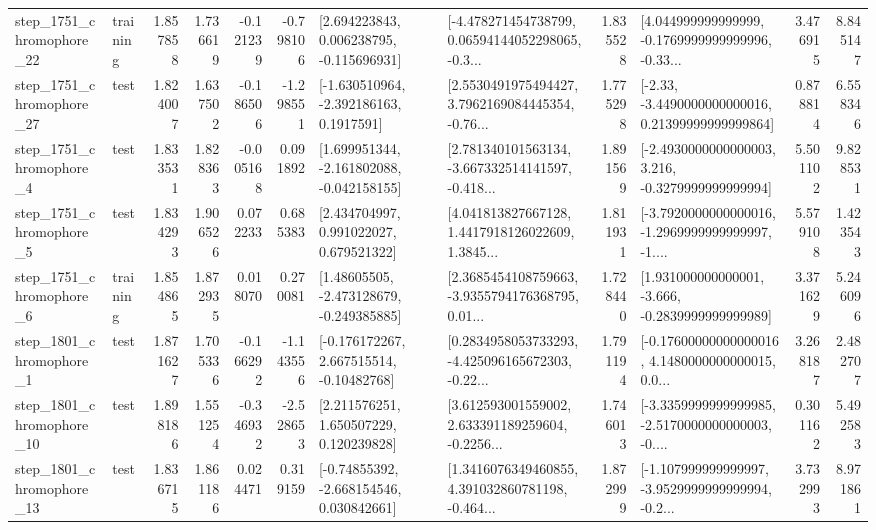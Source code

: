 \begin{tabular}{llrrrrllrlrr}
 step\_1751\_chromophore\_22 &  training &      1.857858 &    1.736619 &     -0.121239 & -0.798106 &    [2.694223843, 0.006238795, -0.115696931] &  [-4.478271454738799, 0.06594144052298065, -0.3... &       1.835528 &  [4.044999999999999, -0.1769999999999996, -0.33... &            3.476915 &          8.845147 \\
 step\_1751\_chromophore\_27 &      test &      1.824007 &    1.637502 &     -0.186506 & -1.298551 &     [-1.630510964, -2.392186163, 0.1917591] &  [2.5530491975494427, 3.7962169084445354, -0.76... &       1.775298 &  [-2.33, -3.4490000000000016, 0.21399999999999864] &            0.878814 &          6.558346 \\
  step\_1751\_chromophore\_4 &      test &      1.833531 &    1.828363 &     -0.005168 &  0.091892 &   [1.699951344, -2.161802088, -0.042158155] &  [2.781340101563134, -3.667332514141597, -0.418... &       1.891569 &  [-2.4930000000000003, 3.216, -0.3279999999999994] &            5.501102 &          9.828531 \\
  step\_1751\_chromophore\_5 &      test &      1.834293 &    1.906526 &      0.072233 &  0.685383 &     [2.434704997, 0.991022027, 0.679521322] &  [4.041813827667128, 1.4417918126022609, 1.3845... &       1.811931 &  [-3.7920000000000016, -1.2969999999999997, -1.... &            5.579108 &          1.423543 \\
  step\_1751\_chromophore\_6 &  training &      1.854865 &    1.872935 &      0.018070 &  0.270081 &    [1.48605505, -2.473128679, -0.249385885] &  [2.3685454108759663, -3.9355794176368795, 0.01... &       1.728440 &   [1.931000000000001, -3.666, -0.2839999999999989] &            3.371629 &          5.246096 \\
  step\_1801\_chromophore\_1 &      test &      1.871627 &    1.705336 &     -0.166292 & -1.143556 &    [-0.176172267, 2.667515514, -0.10482768] &  [0.2834958053733293, -4.425096165672303, -0.22... &       1.791194 &  [-0.17600000000000016, 4.1480000000000015, 0.0... &            3.268187 &          2.482707 \\
 step\_1801\_chromophore\_10 &      test &      1.898186 &    1.551254 &     -0.346932 & -2.528653 &     [2.211576251, 1.650507229, 0.120239828] &  [3.612593001559002, 2.633391189259604, -0.2256... &       1.746013 &  [-3.3359999999999985, -2.5170000000000003, -0.... &            0.301162 &          5.492583 \\
 step\_1801\_chromophore\_13 &      test &      1.836715 &    1.861186 &      0.024471 &  0.319159 &    [-0.74855392, -2.668154546, 0.030842661] &  [1.3416076349460855, 4.391032860781198, -0.464... &       1.872999 &  [-1.107999999999997, -3.9529999999999994, -0.2... &            3.732993 &          8.971861 \\

\end{tabular}
